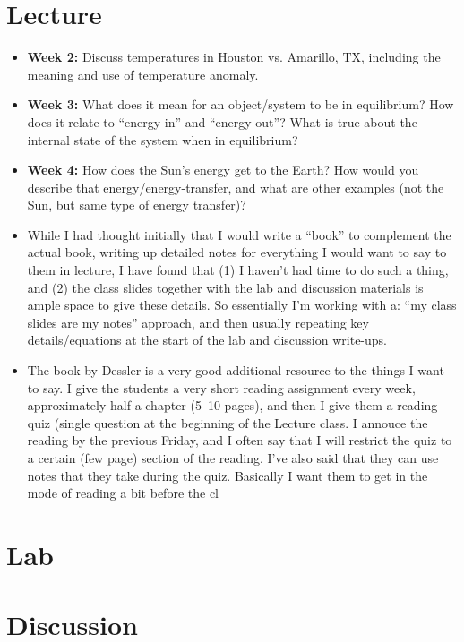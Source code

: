 \documentclass[12pt]{article}
\begin{document}
\newpage
\section{Lecture}  

\begin{itemize}
\item[] {\bf Week 2:} Discuss temperatures in Houston vs. Amarillo, TX, including the meaning and use of temperature anomaly.
\item[] {\bf Week 3:} What does it mean for an object/system to be in equilibrium? How does it relate to “energy in” and “energy out”? What is true about the internal state of the system when in equilibrium?
\item[] {\bf Week 4:} How does the Sun’s energy get to the Earth? How would you describe that energy/energy-transfer, and what are other examples (not the Sun, but same type of energy transfer)?
\end{itemize}

\vspace{0.5cm}



\begin{itemize}

\item While I had thought initially that I would write a ``book'' to complement the actual book, writing up detailed notes for everything I would want to say to them in lecture, I have found that (1) I haven't had time to do such a thing, and (2) the class slides together with the lab and discussion materials is ample space to give these details.  So essentially I'm working with a: ``my class slides are my notes'' approach, and then usually repeating key details/equations at the start of the lab and discussion write-ups.

\item The book by Dessler is a very good additional resource to the things I want to say.  I give the students a very short reading assignment every week, approximately half a chapter (5--10 pages), and then I give them a reading quiz (single question at the beginning of the Lecture class.   I annouce the reading by the previous Friday, and I often say that I will restrict the quiz to a certain (few page) section of the reading.  I've also said that they can use notes that they take during the quiz.  Basically I want them to get in the mode of reading a bit before the cl

\end{itemize}
	
\newpage
\section{Lab}  

	
\newpage
\section{Discussion}  
\end{document}
